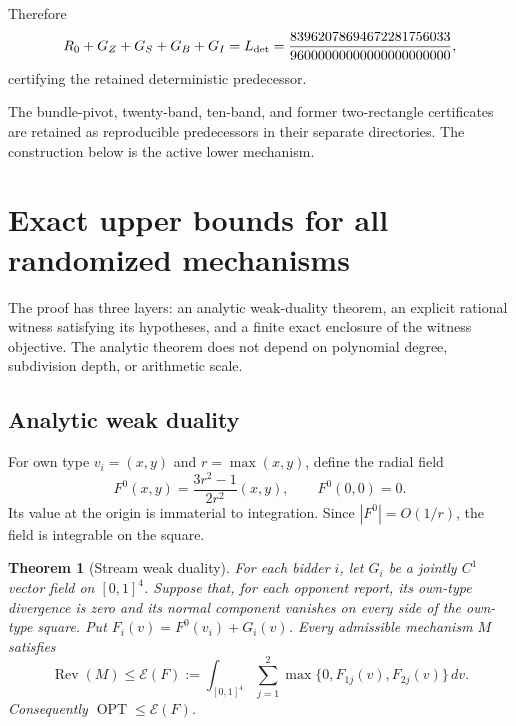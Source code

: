 \documentclass[11pt]{article}
\newtheorem{theorem}{Theorem}
\newcommand{\OPT}{\operatorname{OPT}}
\newcommand{\LowerBound}{\frac{83962078694672281756033}{96000000000000000000000}}
\begin{document}
Therefore
\[
R_0+G_Z+G_S+G_B+G_I
=
L_{\rm det}=\LowerBound,
\]
certifying the retained deterministic predecessor.

The bundle-pivot, twenty-band, ten-band, and former two-rectangle certificates
are retained as reproducible predecessors in their separate directories.
The construction below is the active lower mechanism.



\section{Exact upper bounds for all randomized mechanisms}\label{sec:upper}

The proof has three layers: an analytic weak-duality theorem, an explicit
rational witness satisfying its hypotheses, and a finite exact enclosure of
the witness objective.  The analytic theorem does not depend on polynomial
degree, subdivision depth, or arithmetic scale.

\subsection{Analytic weak duality}\label{subsec:analytic}

For own type \(v_i=(x,y)\) and \(r=\max(x,y)\), define the radial field
\[
F^0(x,y)=\frac{3r^2-1}{2r^2}(x,y),\qquad F^0(0,0)=0.
\]
Its value at the origin is immaterial to integration.  Since
\(|F^0|=O(1/r)\), the field is integrable on the square.

\begin{theorem}[Stream weak duality]\label{thm:stream}
For each bidder \(i\), let \(G_i\) be a jointly \(C^1\) vector field on
\([0,1]^4\).  Suppose that, for each opponent report, its own-type divergence
is zero and its normal component vanishes on every side of the own-type
square.  Put \(F_i(v)=F^0(v_i)+G_i(v)\).  Every admissible mechanism \(M\)
satisfies
\begin{equation}\label{eq:stream-envelope}
\operatorname{Rev}(M)\leq
\mathcal E(F):=\int_{[0,1]^4}\sum_{j=1}^2
\max\{0,F_{1j}(v),F_{2j}(v)\}\,dv.
\end{equation}
Consequently \(\OPT\leq\mathcal E(F)\).
\end{theorem}
\end{document}
